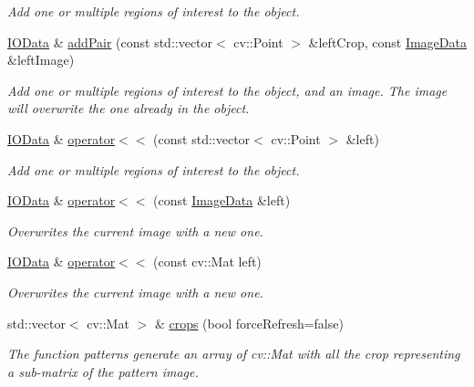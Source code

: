 \begin{DoxyCompactItemize}
\begin{DoxyCompactList}\small\item\em Add one or multiple regions of interest to the object. \end{DoxyCompactList}\item 
\hyperlink{classfilter_1_1data_1_1_i_o_data}{I\+O\+Data} \& \hyperlink{classfilter_1_1data_1_1_square_crop_abb6485dde249188c27ff3b339ea93067}{add\+Pair} (const std\+::vector$<$ cv\+::\+Point $>$ \&left\+Crop, const \hyperlink{classfilter_1_1data_1_1_image_data}{Image\+Data} \&left\+Image)
\begin{DoxyCompactList}\small\item\em Add one or multiple regions of interest to the object, and an image. The image will overwrite the one already in the object. \end{DoxyCompactList}\item 
\hyperlink{classfilter_1_1data_1_1_i_o_data}{I\+O\+Data} \& \hyperlink{classfilter_1_1data_1_1_square_crop_a648729bc989b528bad91ea86154ceee7}{operator$<$$<$} (const std\+::vector$<$ cv\+::\+Point $>$ \&left)
\begin{DoxyCompactList}\small\item\em Add one or multiple regions of interest to the object. \end{DoxyCompactList}\item 
\hyperlink{classfilter_1_1data_1_1_i_o_data}{I\+O\+Data} \& \hyperlink{classfilter_1_1data_1_1_square_crop_abbe28f7fc483ae4ceec244cf9d4da4dc}{operator$<$$<$} (const \hyperlink{classfilter_1_1data_1_1_image_data}{Image\+Data} \&left)
\begin{DoxyCompactList}\small\item\em Overwrites the current image with a new one. \end{DoxyCompactList}\item 
\hyperlink{classfilter_1_1data_1_1_i_o_data}{I\+O\+Data} \& \hyperlink{classfilter_1_1data_1_1_square_crop_a44a6de24b7f945d007c294a959a9a576}{operator$<$$<$} (const cv\+::\+Mat left)
\begin{DoxyCompactList}\small\item\em Overwrites the current image with a new one. \end{DoxyCompactList}\item 
std\+::vector$<$ cv\+::\+Mat $>$ \& \hyperlink{classfilter_1_1data_1_1_square_crop_a066e7ca77734e652eed3943b448db2b6}{crops} (bool force\+Refresh=false)
\begin{DoxyCompactList}\small\item\em The function patterns generate an array of cv\+::\+Mat with all the crop representing a sub-\/matrix of the pattern image. \end{DoxyCompactList}\end{DoxyCompactItemize}
